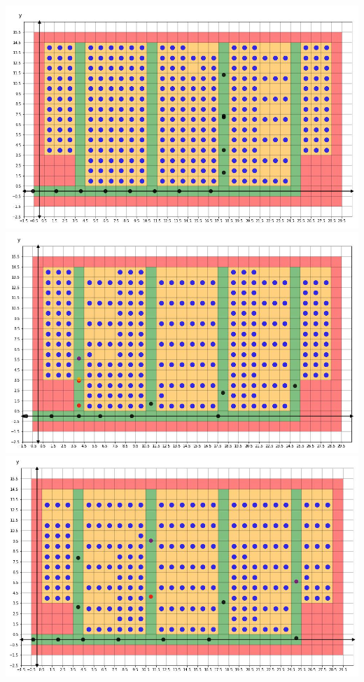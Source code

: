 \documentclass{article}
\theoremstyle{definition}
\theoremstyle{remark}
\numberwithin{equation}{section}
\begin{document}
	\begin{center}
		\clearpage
		\thispagestyle{empty}
		\includegraphics[width = 14cm]{fw1.png} \\
		\includegraphics[width = 14cm]{fw2.png} \\
		\clearpage
		\thispagestyle{empty}
		\includegraphics[width = 14cm]{fw3.png} \\

\end{center}
\end{document}
